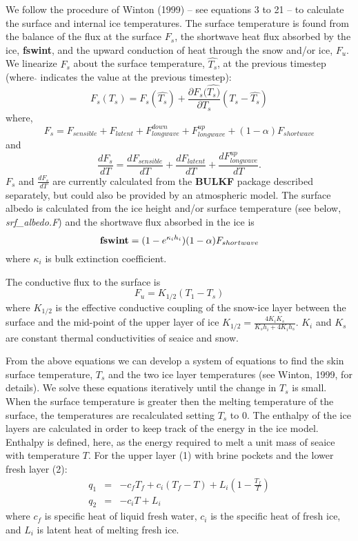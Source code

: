 We follow the procedure
of Winton (1999) -- see equations 3 to 21 -- to calculate
the surface and internal ice temperatures. 
The surface temperature is found from the balance of the
flux at the surface $F_s$, the shortwave heat flux absorbed by the ice, 
{\bf fswint}, and
the upward conduction of heat through the snow and/or ice, $F_u$.
We linearize $F_s$ about the surface temperature, $\hat{T_s}$, 
at the previous timestep (where \mbox{}$\hat{ }$ indicates the value at
the  previous timestep):
\[
F_s (T_s) = F_s(\hat{T_s}) + \frac{\partial F_s(\hat{T_s)}}{\partial T_s}
(T_s-\hat{T_s})
\]
where, 
\[
F_s  =  F_{sensible}+F_{latent}+F_{longwave}^{down}+F_{longwave}^{up}+ (1-
\alpha) F_{shortwave}
\]
and
\[
 \frac{d F_s}{dT} = \frac{d F_{sensible}}{dT} + \frac{d F_{latent}}{dT}
+\frac{d F_{longwave}^{up}}{dT}.
\]
$F_s$ and $\frac{d F_s}{dT}$ are currently calculated from the {\bf BULKF} 
package described separately, but could also be provided by an atmospheric
model. The surface albedo is calculated from the ice height and/or 
surface temperature (see below, {\it srf\_albedo.F}) and the 
shortwave flux absorbed in the ice is
\[
{\bf fswint} = (1-e^{\kappa_i h_i})(1-\alpha) F_{shortwave}
\]
where $\kappa_i$ is bulk extinction coefficient.

The conductive flux to the surface is
\[
F_u=K_{1/2}(T_1-T_s)
\]
where $K_{1/2}$ is the effective conductive coupling of the snow-ice
layer between the surface and the mid-point of the upper layer of ice
$
K_{1/2}=\frac{4 K_i K_s}{K_s h_i + 4 K_i h_s}
$.
$K_i$ and $K_s$ are constant thermal conductivities of seaice and snow.

From the above equations we can develop a system of equations to
find the skin surface temperature, $T_s$ and the two ice layer
temperatures (see Winton, 1999, for details). We solve these
equations iteratively until the change in $T_s$ is small.
When the surface temperature is greater then
the melting temperature of the surface, the temperatures are
recalculated setting $T_s$ to 0.  The enthalpy
of the ice layers are calculated in order to keep track of the energy in the
ice model. Enthalpy is defined, here, as the energy required to melt a
unit mass of seaice with temperature $T$.
For the upper layer (1) with brine pockets  and
the lower fresh layer (2):
\begin{eqnarray}
q_1 & = & - c_f T_f + c_i (T_f-T)+ L_{i}(1-\frac{T_f}{T})
\nonumber \\
q_2 & = & -c_i T+L_i \nonumber
\end{eqnarray}
where $c_f$ is specific heat of liquid fresh water, $c_i$ is the
specific heat of fresh ice, and $L_i$ is latent heat of melting fresh ice.



